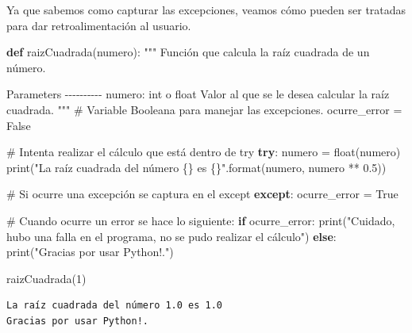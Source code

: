 \documentclass[
  spanish,
  letterpaper,
]{scrbook}
\newenvironment{Shaded}{\begin{snugshade}}{\end{snugshade}}
\newcommand{\BuiltInTok}[1]{\textcolor[rgb]{0.00,0.23,0.31}{#1}}
\newcommand{\CommentTok}[1]{\textcolor[rgb]{0.37,0.37,0.37}{#1}}
\newcommand{\ControlFlowTok}[1]{\textcolor[rgb]{0.00,0.23,0.31}{\textbf{#1}}}
\newcommand{\DecValTok}[1]{\textcolor[rgb]{0.68,0.00,0.00}{#1}}
\newcommand{\FloatTok}[1]{\textcolor[rgb]{0.68,0.00,0.00}{#1}}
\newcommand{\KeywordTok}[1]{\textcolor[rgb]{0.00,0.23,0.31}{\textbf{#1}}}
\newcommand{\NormalTok}[1]{\textcolor[rgb]{0.00,0.23,0.31}{#1}}
\newcommand{\OperatorTok}[1]{\textcolor[rgb]{0.37,0.37,0.37}{#1}}
\newcommand{\SpecialCharTok}[1]{\textcolor[rgb]{0.37,0.37,0.37}{#1}}
\newcommand{\StringTok}[1]{\textcolor[rgb]{0.13,0.47,0.30}{#1}}
\newcommand{\VariableTok}[1]{\textcolor[rgb]{0.07,0.07,0.07}{#1}}
\theoremstyle{definition}
\theoremstyle{remark}
\begin{document}
Ya que sabemos como capturar las excepciones, veamos cómo pueden ser
tratadas para dar retroalimentación al usuario.

\begin{Shaded}
\begin{Highlighting}[]
\KeywordTok{def}\NormalTok{ raizCuadrada(numero):}
    \CommentTok{"""}
\CommentTok{    Función que calcula la raíz cuadrada de un número.}

\CommentTok{    Parameters}
\CommentTok{    {-}{-}{-}{-}{-}{-}{-}{-}{-}{-}}
\CommentTok{    numero: int o float}
\CommentTok{        Valor al que se le desea calcular la raíz cuadrada.}
\CommentTok{    }
\CommentTok{    """}
    \CommentTok{\# Variable Booleana para manejar las excepciones.}
\NormalTok{    ocurre\_error }\OperatorTok{=} \VariableTok{False}
    
    \CommentTok{\# Intenta realizar el cálculo que está dentro de try    }
    \ControlFlowTok{try}\NormalTok{:}
\NormalTok{        numero }\OperatorTok{=} \BuiltInTok{float}\NormalTok{(numero)}
        \BuiltInTok{print}\NormalTok{(}\StringTok{"La raíz cuadrada del número }\SpecialCharTok{\{\}}\StringTok{ es }\SpecialCharTok{\{\}}\StringTok{"}\NormalTok{.}\BuiltInTok{format}\NormalTok{(numero, numero }\OperatorTok{**} \FloatTok{0.5}\NormalTok{))}

    \CommentTok{\# Si ocurre una excepción se captura en el except}
    \ControlFlowTok{except}\NormalTok{:}
\NormalTok{        ocurre\_error }\OperatorTok{=} \VariableTok{True}

    \CommentTok{\# Cuando ocurre un error se hace lo siguiente:}
    \ControlFlowTok{if}\NormalTok{ ocurre\_error:}
        \BuiltInTok{print}\NormalTok{(}\StringTok{"Cuidado, hubo una falla en el programa, no se pudo realizar el cálculo"}\NormalTok{)}
    \ControlFlowTok{else}\NormalTok{:}
        \BuiltInTok{print}\NormalTok{(}\StringTok{"Gracias por usar Python!."}\NormalTok{)}
\end{Highlighting}
\end{Shaded}

\begin{Shaded}
\begin{Highlighting}[]
\NormalTok{raizCuadrada(}\DecValTok{1}\NormalTok{)}
\end{Highlighting}
\end{Shaded}

\begin{verbatim}
La raíz cuadrada del número 1.0 es 1.0
Gracias por usar Python!.
\end{verbatim}
\end{document}
